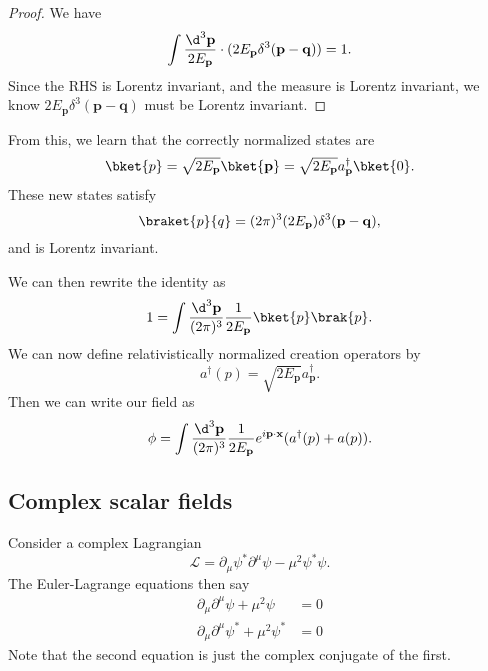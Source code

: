 \documentclass[a4paper]{article}
\begin{document}
\begin{proof}
  We have
  \[
    \int \frac{\d^3 \mathbf{p}}{2 E_\mathbf{p}} \cdot (2E_\mathbf{p} \delta^3(\mathbf{p} - \mathbf{q})) = 1.
  \]
  Since the RHS is Lorentz invariant, and the measure is Lorentz invariant, we know $2E_\mathbf{p} \delta^3(\mathbf{p} - \mathbf{q})$ must be Lorentz invariant.
\end{proof}

From this, we learn that the correctly normalized states are
\[
  \bket{p} = \sqrt{2 E_\mathbf{p}}\bket{\mathbf{p}} = \sqrt{2 E_\mathbf{p}} a_\mathbf{p}^\dagger \bket{0}.
\]
These new states satisfy
\[
  \braket{p}{q} = (2\pi)^3 (2E_\mathbf{p}) \delta^3 (\mathbf{p} - \mathbf{q}),
\]
and is Lorentz invariant.

We can then rewrite the identity as
\[
  1 = \int \frac{\d^3 \mathbf{p}}{(2\pi)^3}\frac{1}{2 E_\mathbf{p}} \bket{p}\brak{p}.
\]
We can now define relativistically normalized creation operators by
\[
  a^\dagger(p) = \sqrt{2E_\mathbf{p}} a_\mathbf{p}^\dagger.
\]
Then we can write our field as
\[
  \phi = \int \frac{\d^3 \mathbf{p}}{(2\pi)^3}\frac{1}{2E_\mathbf{p}} e^{i\mathbf{p}\cdot \mathbf{x}}(a^\dagger(p) + a(p)).
\]
\subsection{Complex scalar fields}
Consider a complex Lagrangian
\[
  \mathcal{L} = \partial_\mu \psi^* \partial^\mu \psi - \mu^2 \psi^* \psi.
\]
The Euler-Lagrange equations then say
\begin{align*}
  \partial_\mu \partial^\mu \psi + \mu^2 \psi &= 0\\
  \partial_\mu \partial^\mu \psi^* + \mu^2 \psi^* &= 0
\end{align*}
Note that the second equation is just the complex conjugate of the first.
\end{document}
